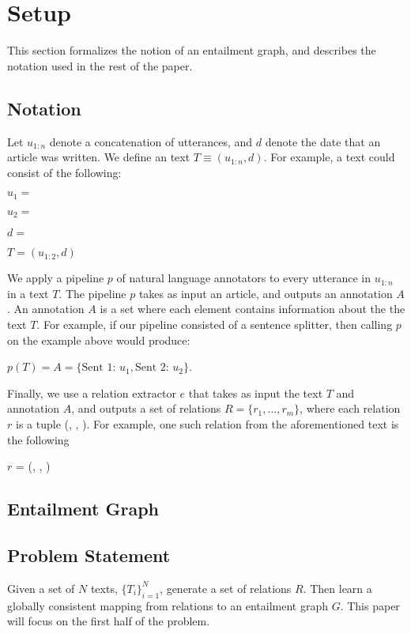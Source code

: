 \section{Setup}
This section formalizes the notion of an entailment graph, and describes
the notation used in the rest of the paper.
\subsection{Notation}
Let $u_{1:n}$ denote a concatenation of utterances, and 
$d$ denote the date that an article was written. We define
an text $T \equiv (u_{1:n}, d)$. For example, a text could consist
of the following:
\begin{description}

  \item $u_1 =$ 
  \item $u_2 =$ 
  \item $d =$  
  \item $T = (u_{1:2}, d)$
\end{description}

We apply a pipeline $p$ of natural language annotators 
to every utterance in $u_{1:n}$ in a text $T$. 
The pipeline $p$ takes as input an article, and outputs an annotation $A$.
An annotation $A$ is a set where each element contains
information about the the text $T$. For example, if our
pipeline consisted of a sentence splitter, then calling $p$
on the example above would produce:
\begin{center}
  $p(T) = A = \{\text{Sent 1: } u_1, \text{Sent 2: } u_2\}$.
\end{center}

Finally, we use a relation extractor $e$ that takes as input
the text $T$ and annotation $A$, and outputs a set of relations $R=\{r_1,\dots,r_m\}$,
where each relation $r$ is a tuple (, , ).
For example, one such relation from the aforementioned text is the following
\begin{center}
  $r$ = (, , )
\end{center}

\subsection{Entailment Graph}

\subsection{Problem Statement}
Given a set of $N$ texts, $\{T_i\}_{i=1}^{N}$, generate a set of 
relations $R$. Then learn a globally consistent mapping
from relations to an entailment graph $G$. This paper will focus
on the first half of the problem.

